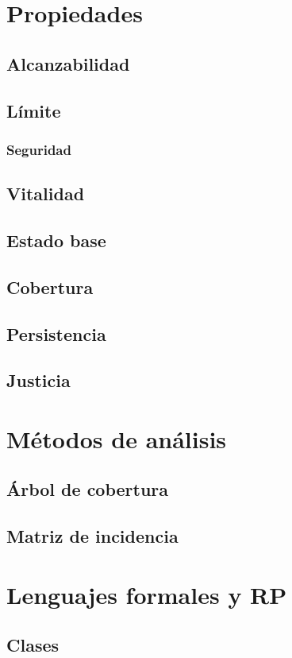 \documentclass[
compress,
xcolor=table,
dvipsnames,
]{beamer}
\begin{document}

\section{Propiedades}
    \subsection{Alcanzabilidad}
    \subsection{Límite}
    \subsubsection{Seguridad}
    \subsection{Vitalidad}
    \subsection{Estado base}
    \subsection{Cobertura}
    \subsection{Persistencia}
    \subsection{Justicia}
\section{Métodos de análisis}
    \subsection{Árbol de cobertura}
    \subsection{Matriz de incidencia}
\section{Lenguajes formales y RP}
    \subsection{Clases}
\end{document}
